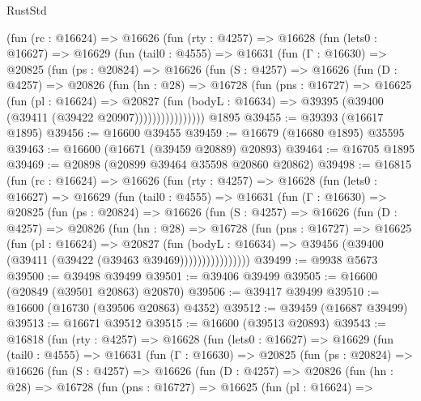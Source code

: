 \begin{lexlean}{RustStd}
\begin{coremodule}
{\begin{coremodule}
{{{{{{{{{{{{{{{{{{{{{{{{{{{{{{{{{{{{{{{{{{{{{{{{{{{{{{{      (fun (rc : @16624) =>
      @16626
        (fun (rty : @4257) =>
        @16628
          (fun (lets0 : @16627) =>
          @16629
            (fun (tail0 : @4555) =>
            @16631
              (fun (Γ : @16630) =>
              @20825
                (fun (ps : @20824) =>
                @16626
                  (fun (S : @4257) =>
                  @16626
                    (fun (D : @4257) =>
                    @20826
                      (fun (hn : @28) =>
                      @16728
                        (fun (pns : @16727) =>
                        @16625
                          (fun (pl : @16624) =>
                          @20827
                            (fun (bodyL : @16634) =>
                            @39395 (@39400 (@39411 (@39422 @20907))))))))))))))))
    @1895
@39455 := @39393 (@16617 @1895)
@39456 := @16600 @39455
@39459 := @16679 (@16680 @1895) @35595
@39463 := @16600 (@16671 (@39459 @20889) @20893)
@39464 := @16705 @1895
@39469 := @20898 (@20899 @39464 @35598 @20860 @20862)
@39498 := @16815
    (fun (rc : @16624) =>
    @16626
      (fun (rty : @4257) =>
      @16628
        (fun (lets0 : @16627) =>
        @16629
          (fun (tail0 : @4555) =>
          @16631
            (fun (Γ : @16630) =>
            @20825
              (fun (ps : @20824) =>
              @16626
                (fun (S : @4257) =>
                @16626
                  (fun (D : @4257) =>
                  @20826
                    (fun (hn : @28) =>
                    @16728
                      (fun (pns : @16727) =>
                      @16625
                        (fun (pl : @16624) =>
                        @20827
                          (fun (bodyL : @16634) =>
                          @39456 (@39400 (@39411 (@39422 (@39463 @39469))))))))))))))))
@39499 := @9938 @5673
@39500 := @39498 @39499
@39501 := @39406 @39499
@39505 := @16600 (@20849 (@39501 @20863) @20870)
@39506 := @39417 @39499
@39510 := @16600 (@16730 (@39506 @20863) @4352)
@39512 := @39459 (@16687 @39499)
@39513 := @16671 @39512
@39515 := @16600 (@39513 @20893)
@39543 := @16818
    (fun (rty : @4257) =>
    @16628
      (fun (lets0 : @16627) =>
      @16629
        (fun (tail0 : @4555) =>
        @16631
          (fun (Γ : @16630) =>
          @20825
            (fun (ps : @20824) =>
            @16626
              (fun (S : @4257) =>
              @16626
                (fun (D : @4257) =>
                @20826
                  (fun (hn : @28) =>
                  @16728
                    (fun (pns : @16727) =>
                    @16625
                      (fun (pl : @16624) =>
}}}}}}}}}}}}}}}}}}}}}}}}}}}}}}}}}}}}}}}}}}}}}}}}}}}}}}}
\end{coremodule}}
\end{coremodule}
\end{lexlean}
